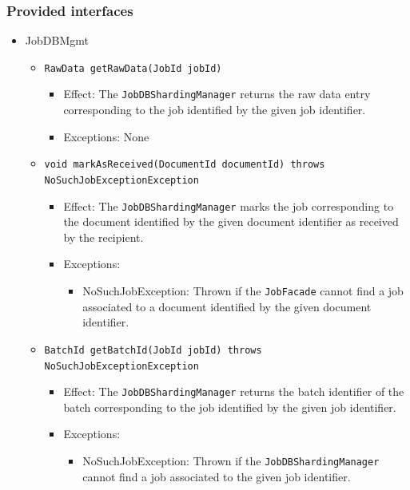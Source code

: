 \documentclass[a4paper,10pt]{article}
\begin{document}
\subsubsection*{Provided interfaces}
\begin{itemize}
    \item JobDBMgmt
    \begin{itemize}
	    \item \texttt{RawData getRawData(JobId jobId)}
        \begin{itemize}
            \item Effect: The \texttt{JobDBShardingManager} returns the raw data entry corresponding to the job identified by the given job identifier.
            \item Exceptions: None
        \end{itemize}    

     	\item \texttt{void markAsReceived(DocumentId documentId) throws NoSuchJobExceptionException}
    	\begin{itemize}
    		\item Effect: The \texttt{JobDBShardingManager} marks the job corresponding to the document identified by the given document identifier as received by the recipient.
    		\item Exceptions:
    		\begin{itemize}
    			\item NoSuchJobException: Thrown if the \texttt{JobFacade} cannot find a job associated to a document identified by the given document identifier.
    		\end{itemize}
    	\end{itemize}
    	
   	   \item \texttt{BatchId getBatchId(JobId jobId) throws NoSuchJobExceptionException}
    	\begin{itemize}
    		\item Effect: The \texttt{JobDBShardingManager} returns the batch identifier of the batch corresponding to the job identified by the given job identifier.
    		\item Exceptions:
    		\begin{itemize}
    			\item NoSuchJobException: Thrown if the \texttt{JobDBShardingManager} cannot find a job associated to the given job identifier.
    		\end{itemize}
    	\end{itemize}	


\end{itemize}
\end{itemize}
\end{document}
